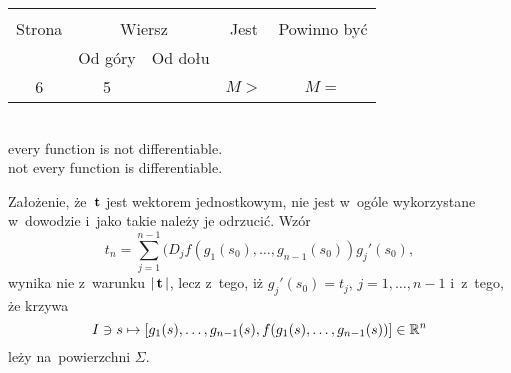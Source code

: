 \documentclass[a4paper,11pt]{article}
\begin{document}


\begin{center}

  \begin{tabular}{|c|c|c|c|c|}
    \hline
    & \multicolumn{2}{c|}{} & & \\
    Strona & \multicolumn{2}{c|}{Wiersz} & Jest
                              & Powinno być \\ \cline{2-3}
    & Od góry & Od dołu & & \\
    \hline
    6   &  5 & & $M >$ & $M =$ \\
    \hline
  \end{tabular}

\end{center}

\noindent
{} \\
\Jest  every function is not differentiable. \\
\Powin not every function is differentiable. \\

\vspace{\spaceTwo}














\start {} Założenie, że~$\mathbf{t}$ jest wektorem jednostkowym, nie jest w~ogóle wykorzystane w~dowodzie i~jako takie należy je odrzucić. Wzór
\begin{equation}
  \label{eq:MarcinkowskaWDTRRCz-01}
  t_{ n } =
  \sum_{ j = 1 }^{ n - 1 } ( D_{ j } f\left( g_{ 1 }( s_{ 0 } ), \ldots,
  g_{ n - 1 }( s_{ 0 } ) \right) g_{ j }'( s_{ 0 } ),
\end{equation}
wynika nie z~warunku $|\, {  \mathbf{t}  } \,|$, lecz z~tego,
iż $g_{ j }'( s_{ 0 } ) = t_{ j }$, $j = 1, \ldots, n - 1$ i~z~tego, że krzywa
\begin{equation}
  \label{eq:MarcinkowskaWDTRRCz-02}
  I \ni s \mapsto [ g_{ 1 }( s ), \ldots, g_{ n - 1 }( s ),
  f( g_{ 1 }( s ), \ldots, g_{ n - 1 }( s ) ) ] \in \mathbb{R}^{ n }
\end{equation}
leży na~powierzchni $\Sigma$.
\end{document}
